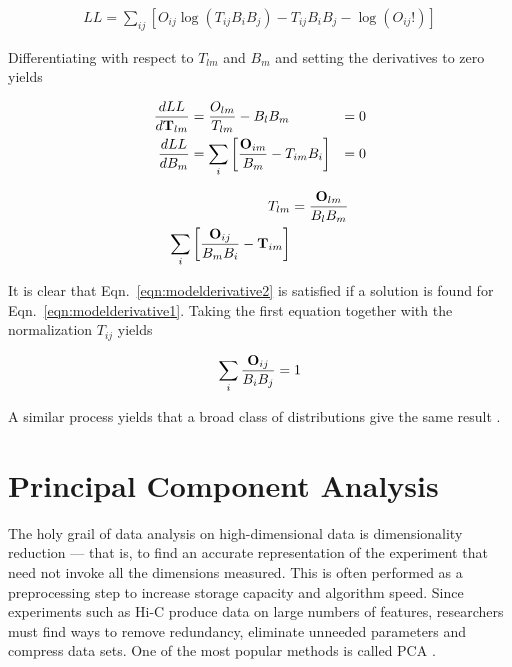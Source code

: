 \begin{align}
  \label{eqn:llmodel}
  LL = \sum_{ij}\left[O_{ij}\log{(T_{ij}B_{i}B_{j})} - T_{ij}B_{i}B_{j} - \log{(O_{ij}!)}\right]
\end{align}

Differentiating with respect to $T_{lm}$ and $B_m$ and setting the derivatives to zero yields

\noindent\begin{minipage}{.5\linewidth}
  \begin{align}
    \label{eqn:modelderivative1}
    \frac{dLL}{d\mathbf{T}_{lm}} &= \frac{O_{lm}}{T_{lm}} - B_{l}B_{m} &= 0
    \\
    \frac{dLL}{dB_{m}} &= \sum_i\left[\frac{\mathbf{O}_{im}}{B_m} - T_{im}B_i\right] &= 0
  \end{align}
\end{minipage}%
\begin{minipage}{.5\linewidth}
  \begin{align}
    \label{eqn:modelderivative2}
    T_{lm} &= \frac{\mathbf{O}_{lm}}{B_{l}B_{m}} \\
    \sum_i\left[\frac{\mathbf{O}_{ij}}{B_{m}B_{i}} - \mathbf{T}_{im}\right]
  \end{align}
\end{minipage}

It is clear that Eqn.~\eqref{eqn:modelderivative2} is satisfied if a solution is found for Eqn.~\eqref{eqn:modelderivative1}.  Taking the first equation together  with the
normalization $T_{ij}$ yields

\begin{align}
  \label{eqn:result}
  \sum_i \frac{\mathbf{O}_{ij}}{B_{i}B_{j}} = 1
\end{align}

A similar process yields that a broad class of distributions give the same result \citep{imakaev2012}.

\section*{Principal Component Analysis}

The holy grail of data analysis on high-dimensional data is dimensionality reduction --- that is, to find an accurate representation of
the experiment that need not invoke all the dimensions measured.  This is often performed as a preprocessing step to increase storage capacity
and algorithm speed.  Since experiments such as Hi-C produce data on large numbers of features, researchers must find ways to remove redundancy,
eliminate unneeded parameters and compress data sets.  One of the most popular methods is called \gls{PCA} \citep{law1987}.

